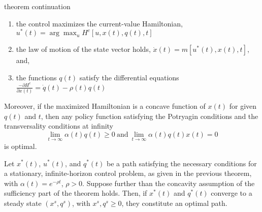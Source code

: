 \documentclass[aspectratio=169]{beamer}
\begin{document}
\begin{frame}{theorem continuation}
    \begin{enumerate}
        \item the control maximizes the current-value Hamiltonian, $u^*(t)=\arg\max_{u}H^c[u,x(t),q(t),t]$
        \item the law of motion of the state vector holds, $\dot{x}(t)=m[u^*(t),x(t),t]$, and,
        \item the functions $q(t)$ satisfy the differential equations $\frac{-\partial H^c}{\partial x(t)}=\dot{q}(t)-\rho(t)q(t)$
    \end{enumerate}
    Moreover, if the maximized Hamiltonian is a concave function of $x(t)$ for given $q(t)$ and $t$, then any policy function satisfying the Potryagin conditions and the transversality conditions at infinity \[\lim_{t\rightarrow\infty}\alpha(t)q(t)\geq 0\ \text{and}\ \lim_{t\rightarrow\infty}\alpha(t)q(t)x(t)=0\] is optimal.
\end{frame}

\begin{frame}
    \begin{theorem}
        Let $x^*(t)$, $u^*(t)$, and $q^*(t)$ be a path satisfying the necessary conditions for a stationary, infinite-horizon control problem, as given in the previous theorem, with $\alpha(t)=e^{-\rho t}$, $\rho>0$. Suppose further than the concavity assumption of the sufficiency part of the theorem holds. Then, if $x^*(t)$ and $q^*(t)$ converge to a steady state $(x^s,q^s)$, with $x^s,q^s\geq0$, they constitute an optimal path.
    \end{theorem}
\end{frame} 
\end{document}
